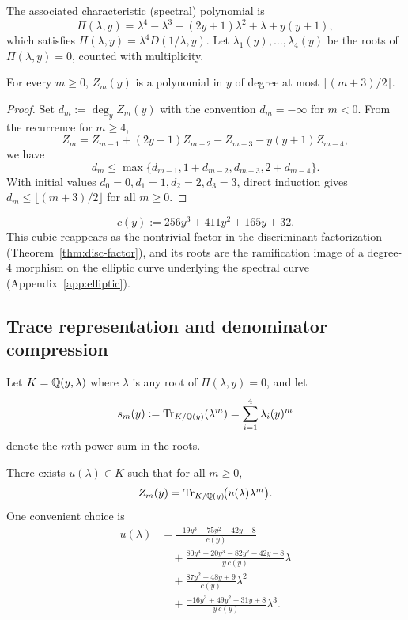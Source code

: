 The associated characteristic (spectral) polynomial is
\begin{equation}\label{eq:spectral-poly}
\Pi(\lambda,y)=\lambda^4-\lambda^3-(2y+1)\lambda^2+\lambda+y(y+1),
\end{equation}
which satisfies $\Pi(\lambda,y)=\lambda^4 D(1/\lambda,y)$.
Let $\lambda_1(y),\dots,\lambda_4(y)$ be the roots of $\Pi(\lambda,y)=0$, counted with multiplicity.
\begin{lemma}\label{lem:deg-growth}
For every $m\ge0$, $Z_m(y)$ is a polynomial in $y$ of degree at most $\lfloor (m+3)/2\rfloor$.
\begin{proof}
Set $d_m:=\deg_y Z_m(y)$ with the convention $d_m=-\infty$ for $m<0$.
From the recurrence for $m\ge4$,
\[
Z_m=Z_{m-1}+(2y+1)Z_{m-2}-Z_{m-3}-y(y+1)Z_{m-4},
\]
we have
\[
d_m\le \max\{d_{m-1},1+d_{m-2},d_{m-3},2+d_{m-4}\}.
\]
With initial values $d_0=0,d_1=1,d_2=2,d_3=3$, direct induction gives
$d_m\le \lfloor (m+3)/2\rfloor$ for all $m\ge0$.
\end{proof}
\end{lemma}

\begin{equation}\label{eq:cubic-model}
c(y):=256y^3+411y^2+165y+32.
\end{equation}
This cubic reappears as the nontrivial factor in the discriminant factorization (Theorem~\ref{thm:disc-factor}), and its roots are the ramification image of a degree-$4$ morphism on the elliptic curve underlying the spectral curve (Appendix~\ref{app:elliptic}).

\subsection{Trace representation and denominator compression}
\label{subsec:trace-compression}

Let \(K=\mathbb{Q}(y,\lambda)\) where \(\lambda\) is any root of \(\Pi(\lambda,y)=0\), and let
\[
s_m(y):=\operatorname{Tr}_{K/\mathbb{Q}(y)}(\lambda^m)=\sum_{i=1}^4\lambda_i(y)^m
\]
denote the \(m\)th power-sum in the roots.

\begin{theorem}\label{thm:trace-representation}
There exists \(u(\lambda)\in K\) such that for all \(m\ge 0\),
\begin{equation}\label{eq:trace-repr}
Z_m(y)=\operatorname{Tr}_{K/\mathbb{Q}(y)}\!\bigl(u(\lambda)\lambda^m\bigr).
\end{equation}
One convenient choice is
\[
\begin{aligned}
u(\lambda)&=\frac{-19y^3-75y^2-42y-8}{c(y)}
 \\
&\quad+\frac{80y^4-20y^3-82y^2-42y-8}{y\,c(y)}\lambda
 \\
&\quad+\frac{87y^2+48y+9}{c(y)}\lambda^2
\;\\
&\quad+\frac{-16y^3+49y^2+31y+8}{y\,c(y)}\lambda^3.
\end{aligned}
\]
\end{theorem}

